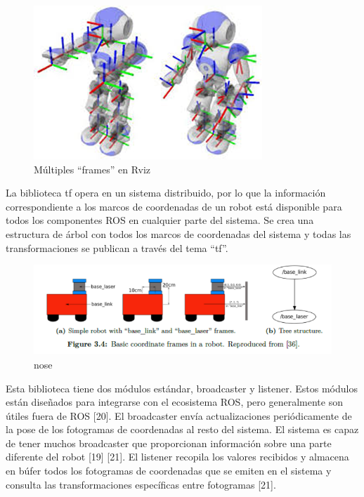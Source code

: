         \begin{figure}[htb]
            \centering
            \includegraphics[width=0.8\linewidth]{Main/Chapter3/Images3/3-6/ejemplo-multiples-frames-rviz.png}
            \caption{Múltiples ``frames'' en Rviz}
            \label{f:Cap3-6_frames_rviz}
        \end{figure}
        
        La biblioteca tf opera en un sistema distribuido, por lo que la información correspondiente a los marcos de coordenadas de un robot está disponible para todos los componentes ROS en cualquier parte del sistema. Se crea una estructura de árbol con todos los marcos de coordenadas del sistema y todas las transformaciones se publican a través del tema “tf”.
      
        \begin{figure}[htb]
            \centering
            \includegraphics[width=0.8\linewidth]{Main/Chapter3/Images3/3-6/estructura-arbol-tf.png}
            \caption{nose}
            \label{f:Cap3-6_nose1}
        \end{figure}    
        
        Esta biblioteca tiene dos módulos estándar, broadcaster y listener. Estos módulos están diseñados para integrarse con el ecosistema ROS, pero generalmente son útiles fuera de ROS [20]. El broadcaster envía actualizaciones periódicamente de la pose de los fotogramas de coordenadas al resto del sistema. El sistema es capaz de tener muchos broadcaster que proporcionan información sobre una parte diferente del robot [19] [21]. El listener recopila los valores recibidos y almacena en búfer todos los fotogramas de coordenadas que se emiten en el sistema y consulta las transformaciones específicas entre fotogramas [21].

